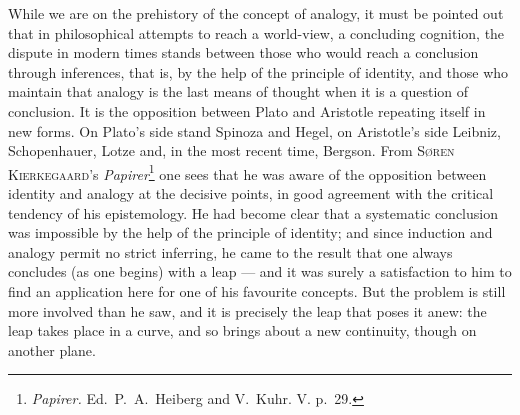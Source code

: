 \documentclass[12pt]{book}
\begin{document}
While we are on the prehistory of the concept of analogy, it must be pointed out
that in philosophical attempts to reach a world-view, a concluding cognition,
the dispute in modern times stands between those who would reach a conclusion
through inferences, that is, by the help of the principle of identity, and those
who maintain that analogy is the last means of thought when it is a question of
conclusion. It is the opposition between Plato and Aristotle repeating itself in
new forms. On Plato's side stand Spinoza and Hegel, on Aristotle's side Leibniz,
Schopenhauer, Lotze and, in the most recent time, Bergson. From \textsc{Søren
Kierkegaard}'s \textit{Papirer}\footnote{\textit{Papirer.} Ed.\ P.\ A.\ Heiberg
and V.\ Kuhr. V. p.\ 29.} one sees that he was aware of the opposition between
identity and analogy at the decisive points, in good agreement with the critical
tendency of his epistemology. He had become clear that a systematic conclusion
was impossible by the help of the principle of identity; and since induction and
analogy permit no strict inferring, he came to the result that one always
concludes (as one begins) with a leap --- and it was surely a satisfaction to
him to find an application here for one of his favourite concepts. But the
problem is still more involved than he saw, and it is precisely the leap that
poses it anew: the leap takes place in a curve, and so brings about a new
continuity, though on another plane.
\end{document}
